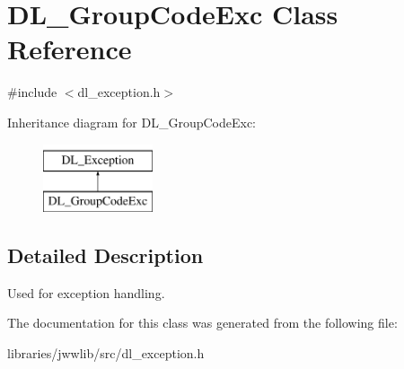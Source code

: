 \hypertarget{classDL__GroupCodeExc}{\section{D\-L\-\_\-\-Group\-Code\-Exc Class Reference}
\label{classDL__GroupCodeExc}
}


{\ttfamily \#include $<$dl\-\_\-exception.\-h$>$}

Inheritance diagram for D\-L\-\_\-\-Group\-Code\-Exc\-:\begin{figure}[H]
\begin{center}
\leavevmode
\includegraphics[height=2.000000cm]{classDL__GroupCodeExc}
\end{center}
\end{figure}


\subsection{Detailed Description}
Used for exception handling. 

The documentation for this class was generated from the following file\-:\begin{DoxyCompactItemize}
\item 
libraries/jwwlib/src/dl\-\_\-exception.\-h\end{DoxyCompactItemize}
